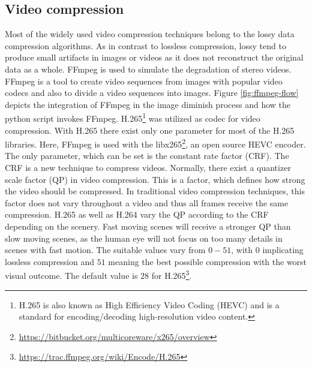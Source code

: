 \subsection*{Video compression}

Most of the widely used video compression techniques belong to the lossy data compression algorithms.
As in contrast to lossless compression, lossy tend to produce small artifacts in images or videos as it does not reconstruct the original data as a whole.
FFmpeg \citep{FFMPEG2010} is used to simulate the degradation of stereo videos.
FFmpeg is a tool to create video sequences from images with popular video codecs and also to divide a video sequences into images.
Figure \ref{fig:ffmpeg-flow} depicts the integration of FFmpeg in the image diminish process and how the python script invokes FFmpeg.
\newline\newline\noindent H.265\footnote{H.265 is also known as High Efficiency Video Coding (HEVC) and is a standard for encoding/decoding high-resolution video content.} was utilized as codec for video compression.
With H.265 there exist only one parameter for most of the H.265 libraries.
Here, FFmpeg is used with the libx265\footnote{\url{https://bitbucket.org/multicoreware/x265/overview}}, an open source HEVC encoder.
The only parameter, which can be set is the constant rate factor (CRF).
\newline\newline\noindent The CRF is a new technique to compress videos.
Normally, there exist a quantizer scale factor (QP) in video compression.
This is a factor, which defines how strong the video should be compressed.
In traditional video compression techniques, this factor does not vary throughout a video and thus all frames receive the same compression.
H.265 as well as H.264 vary the QP according to the CRF depending on the scenery.
Fast moving scenes will receive a stronger QP than slow moving scenes, as the human eye will not focus on too many details in scenes with fast motion.
The suitable values vary from $0-51$, with $0$ implicating lossless compression and $51$ meaning the best possible compression with the worst visual outcome.
The default value is $28$ for H.265\footnote{\url{https://trac.ffmpeg.org/wiki/Encode/H.265}}.

